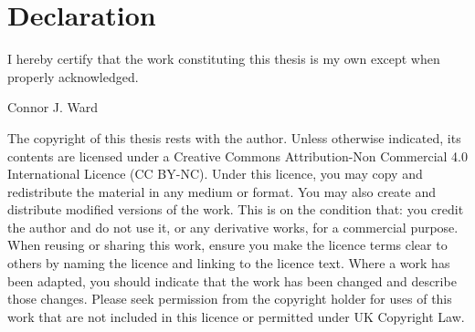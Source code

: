 \chapter*{Declaration}

\vspace{1cm}

\begin{center}
  \begin{minipage}{.7\textwidth}
    I hereby certify that the work constituting this thesis is my own except when properly acknowledged.
  \end{minipage}
\end{center}

\vspace{.6cm}

\hfill
Connor J. Ward

\vspace{4cm}

The copyright of this thesis rests with the author.
Unless otherwise indicated, its contents are licensed under a Creative Commons Attribution-Non Commercial 4.0 International Licence (CC BY-NC).
Under this licence, you may copy and redistribute the material in any medium or format.
You may also create and distribute modified versions of the work.
This is on the condition that: you credit the author and do not use it, or any derivative works, for a commercial purpose.
When reusing or sharing this work, ensure you make the licence terms clear to others by naming the licence and linking to the licence text.
Where a work has been adapted, you should indicate that the work has been changed and describe those changes.
Please seek permission from the copyright holder for uses of this work that are not included in this licence or permitted under UK Copyright Law.

\clearpage
